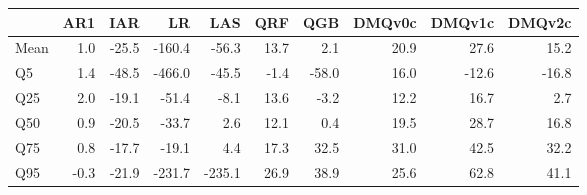 \begin{tabular}{lrrrrrrrrr}
\toprule
 & AR1 & IAR & LR & LAS & QRF & QGB & DMQv0c & DMQv1c & DMQv2c \\
\midrule
Mean & 1.0 & -25.5 & -160.4 & -56.3 & 13.7 & 2.1 & 20.9 & 27.6 & 15.2 \\
Q5 & 1.4 & -48.5 & -466.0 & -45.5 & -1.4 & -58.0 & 16.0 & -12.6 & -16.8 \\
Q25 & 2.0 & -19.1 & -51.4 & -8.1 & 13.6 & -3.2 & 12.2 & 16.7 & 2.7 \\
Q50 & 0.9 & -20.5 & -33.7 & 2.6 & 12.1 & 0.4 & 19.5 & 28.7 & 16.8 \\
Q75 & 0.8 & -17.7 & -19.1 & 4.4 & 17.3 & 32.5 & 31.0 & 42.5 & 32.2 \\
Q95 & -0.3 & -21.9 & -231.7 & -235.1 & 26.9 & 38.9 & 25.6 & 62.8 & 41.1 \\
\bottomrule
\end{tabular}
